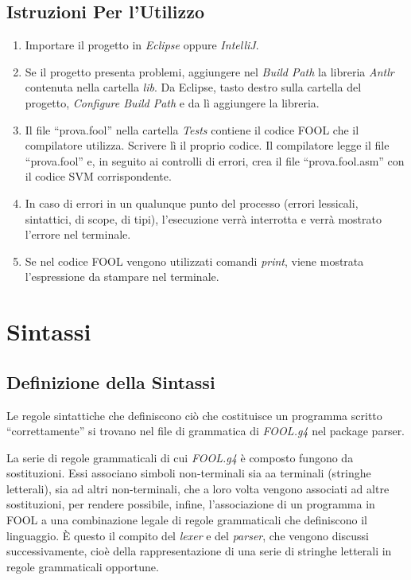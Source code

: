 \documentclass{scrreprt}
\begin{document}
\section{Istruzioni Per l'Utilizzo}
\begin{enumerate}
    \item Importare il progetto in \textit{Eclipse} oppure \textit{IntelliJ}.
    \item Se il progetto presenta problemi, aggiungere nel \textit{Build Path} la libreria \textit{Antlr} contenuta nella cartella \textit{lib}.
        Da Eclipse, tasto destro sulla cartella del progetto, \textit{Configure Build Path} e da lì aggiungere la libreria.
    \item Il file ``prova.fool'' nella cartella \textit{Tests} contiene il codice FOOL che il compilatore utilizza. Scrivere lì il proprio codice. 
        Il compilatore legge il file ``prova.fool'' e, in seguito ai controlli di errori, crea il file ``prova.fool.asm'' con il codice SVM corrispondente.
    \item In caso di errori in un qualunque punto del processo (errori lessicali, sintattici, di scope, di tipi), l'esecuzione verrà interrotta e verrà mostrato l'errore
        nel terminale.
    \item Se nel codice FOOL vengono utilizzati comandi \textit{print}, viene mostrata l'espressione da stampare nel terminale. 
\end{enumerate}

\chapter{Sintassi}

\section{Definizione della Sintassi}
Le regole sintattiche che definiscono ciò che costituisce un programma scritto ``correttamente'' si 
trovano nel file di grammatica di \textit{FOOL.g4} nel package parser.

La serie di regole grammaticali di cui \textit{FOOL.g4} è composto fungono da sostituzioni. Essi associano simboli
non-terminali sia aa terminali (stringhe letterali), sia ad altri non-terminali, che a loro volta vengono associati 
ad altre sostituzioni, per rendere possibile, infine, l’associazione di un programma in FOOL a una combinazione legale
di regole grammaticali che definiscono il linguaggio. 
È questo il compito del \textit{lexer} e del \textit{parser}, che vengono discussi successivamente, cioè della 
rappresentazione di una serie di stringhe letterali in regole grammaticali opportune. 
\end{document}
